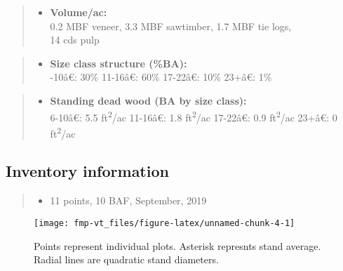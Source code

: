 \documentclass[]{tufte-handout}
\newcommand{\euro}{€}
\providecommand{\tightlist}{%
  \setlength{\itemsep}{0pt}\setlength{\parskip}{0pt}}
\begin{document}
\begin{quote}
\begin{itemize}
\tightlist
\item
  \textbf{Volume/ac:}\\
  \vspace{2pt} 0.2 MBF veneer, 3.3 MBF sawtimber, 1.7 MBF tie logs,\\
  14 cds pulp
\end{itemize}
\end{quote}

\begin{quote}
\begin{itemize}
\tightlist
\item
  \textbf{Size class structure (\%BA):}\\
  \vspace{2pt} -10â\euro{}: 30\% \textbar{} 11-16â\euro{}:
  60\% \textbar{} 17-22â\euro{}: 10\% \textbar{} 23+â\euro{}: 1\%
\end{itemize}
\end{quote}

\begin{quote}
\begin{itemize}
\tightlist
\item
  \textbf{Standing dead wood (BA by size class):}\\
  \vspace{2pt} 6-10â\euro{}: 5.5 ft\textsuperscript{2}/ac \textbar{}
  11-16â\euro{}: 1.8 ft\textsuperscript{2}/ac \textbar{}
  17-22â\euro{}: 0.9 ft\textsuperscript{2}/ac \textbar{} 23+â\euro{}:
  0 ft\textsuperscript{2}/ac
\end{itemize}
\end{quote}

\subsection{Inventory information}\label{inventory-information}

\begin{quote}
\begin{itemize}
\tightlist
\item
  11 points, 10 BAF, September, 2019
\end{itemize}
\end{quote}

\begin{figure}
\texttt{[image: fmp-vt\_files/figure-latex/unnamed-chunk-4-1]} \caption[Points represent individual plots]{Points represent individual plots. Asterisk represnts stand average. Radial lines are quadratic stand diameters.}\label{fig:unnamed-chunk-4}
\end{figure}
\end{document}

